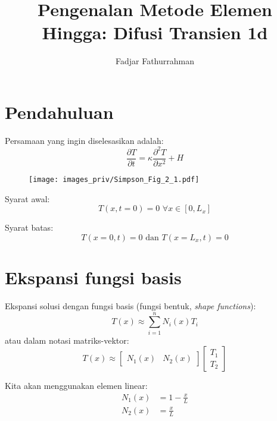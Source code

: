 %




\title{Pengenalan Metode Elemen Hingga: Difusi Transien 1d}
\author{Fadjar Fathurrahman}
\date{}
\maketitle

\section*{Pendahuluan}

Persamaan yang ingin diselesasikan adalah:
\begin{equation*}
\frac{\partial T}{\partial t} = \kappa \frac{\partial^2 T}{\partial x^2} + H
\end{equation*}

\begin{figure}[h]
{\centering
\texttt{[image: images\_priv/Simpson\_Fig\_2\_1.pdf]}
\par}
\end{figure}

Syarat awal:
\begin{equation*}
T(x,t=0) = 0 \,\, \forall x \in [0,L_{x}]
\end{equation*}

Syarat batas:
\begin{equation*}
T(x=0,t) = 0 \,\, \text{dan} \,\, T(x=L_{x},t) = 0
\end{equation*}

\section*{Ekspansi fungsi basis}
Ekspansi solusi dengan fungsi basis (fungsi bentuk, \textit{shape functions}):
\begin{equation*}
T(x) \approx \sum_{i=1}^{n} N_{i}(x) T_{i}
\end{equation*}
atau dalam notasi matriks-vektor:
\begin{equation*}
T(x) \approx \begin{bmatrix}
N_{1}(x) & N_{2}(x)
\end{bmatrix} \begin{bmatrix}
T_{1} \\ T_{2}
\end{bmatrix}
\end{equation*}

Kita akan menggunakan elemen linear:
\begin{align*}
N_{1}(x) & = 1 - \frac{x}{L} \\
N_{2}(x) & = \frac{x}{L}
\end{align*}


